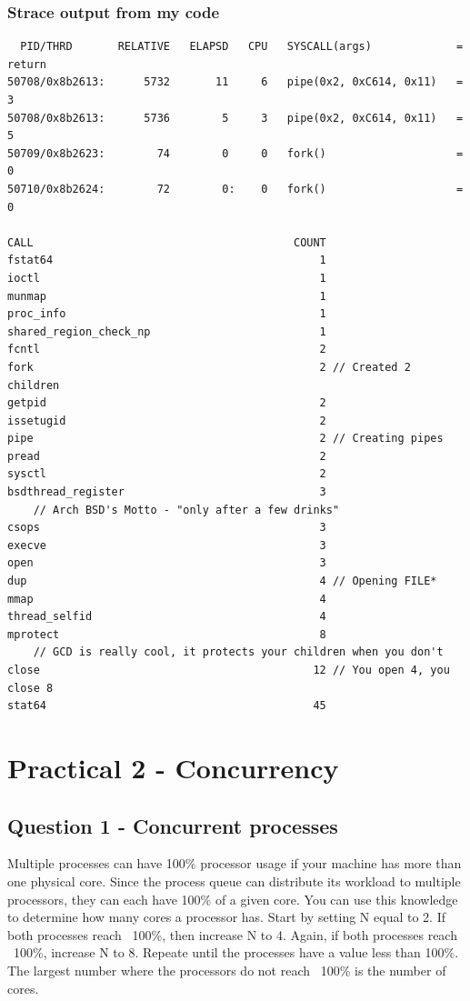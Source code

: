 \documentclass[12pt,a4paper,oneside]{article}
\begin{document}
\subsubsection{Strace output from my code}
\begin{verbatim}
  PID/THRD       RELATIVE   ELAPSD   CPU   SYSCALL(args)             = return
50708/0x8b2613:      5732       11     6   pipe(0x2, 0xC614, 0x11)   = 3
50708/0x8b2613:      5736        5     3   pipe(0x2, 0xC614, 0x11)   = 5
50709/0x8b2623:        74        0     0   fork()                    = 0
50710/0x8b2624:        72        0:    0   fork()                    = 0

CALL                                        COUNT
fstat64                                         1
ioctl                                           1
munmap                                          1
proc_info                                       1
shared_region_check_np                          1
fcntl                                           2
fork                                            2 // Created 2 children
getpid                                          2
issetugid                                       2
pipe                                            2 // Creating pipes
pread                                           2
sysctl                                          2
bsdthread_register                              3
    // Arch BSD's Motto - "only after a few drinks"
csops                                           3
execve                                          3
open                                            3
dup                                             4 // Opening FILE*
mmap                                            4
thread_selfid                                   4
mprotect                                        8
    // GCD is really cool, it protects your children when you don't
close                                          12 // You open 4, you close 8
stat64                                         45
\end{verbatim}

\newpage

\section{Practical 2 - Concurrency}
\subsection{Question 1 - Concurrent processes}
Multiple processes can have 100\% processor usage if your machine has more than one physical core.  Since the process queue can distribute its workload to multiple processors, they can each have 100\% of a given core.  You can use this knowledge to determine how many cores a processor has.  Start by setting N equal to 2.  If both processes reach ~100\%, then increase N to 4.  Again, if both processes reach ~100\%, increase N to 8.  Repeate until the processes have a value less than 100\%.  The largest number where the processors do not reach ~100\% is the number of cores.
\end{document}
